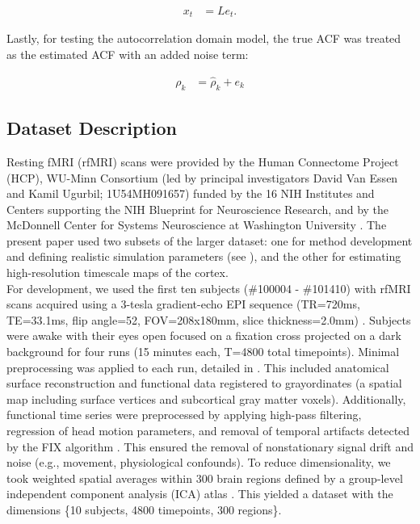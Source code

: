 \documentclass[main.tex]{subfiles}
\begin{document}
\begin{align}
    x_t &= L e_t.
\end{align}

\noindent Lastly, for testing the autocorrelation domain model, the true ACF was treated as the estimated ACF with an added noise term:

\begin{align}
    \rho_k &= \hat\rho_k + e_k
\end{align}

\subsection{Dataset Description}\label{sec:dataset-description}

Resting fMRI (rfMRI) scans were provided by the Human Connectome Project (HCP), WU-Minn Consortium (led by principal investigators David Van Essen and Kamil Ugurbil; 1U54MH091657) funded by the 16 NIH Institutes and Centers supporting the NIH Blueprint for Neuroscience Research, and by the McDonnell Center for Systems Neuroscience at Washington University \citep{van_essen_wu-minn_2013}. The present paper used two subsets of the larger dataset: one for method development and defining realistic simulation parameters (see ), and the other for estimating high-resolution timescale maps of the cortex.\\

For development, we used the first ten subjects (\#100004 - \#101410) with rfMRI scans acquired using a 3-tesla gradient-echo EPI sequence (TR=720ms, TE=33.1ms, flip angle=52\textdegree, FOV=208x180mm, slice thickness=2.0mm) \citep{van_essen_wu-minn_2013}. Subjects were awake with their eyes open focused on a fixation cross projected on a dark background for four runs (15 minutes each, T=4800 total timepoints). Minimal preprocessing was applied to each run, detailed in \citep{glasser_minimal_2013}. This included anatomical surface reconstruction \citep{robinson_msm_2014} and functional data registered to grayordinates (a spatial map including surface vertices and subcortical gray matter voxels). Additionally, functional time series were preprocessed by applying high-pass filtering, regression of head motion parameters, and removal of temporal artifacts detected by the FIX algorithm \citep{salimi-khorshidi_automatic_2014}. This ensured the removal of nonstationary signal drift and noise (e.g., movement, physiological confounds). To reduce dimensionality, we took weighted spatial averages within 300 brain regions defined by a group-level independent component analysis (ICA) atlas \citep{smith_resting-state_2013}. This yielded a dataset with the dimensions \{10 subjects, 4800 timepoints, 300 regions\}.\\
\end{document}
